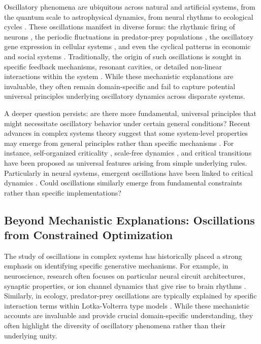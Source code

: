 \documentclass[11pt,a4paper]{article}
\begin{document}
Oscillatory phenomena are ubiquitous across natural and artificial systems, from the quantum scale to astrophysical dynamics, from neural rhythms to ecological cycles \cite{Strogatz2015,Pikovsky2003,Buzsaki2006}. These oscillations manifest in diverse forms: the rhythmic firing of neurons \cite{Buzsaki2006}, the periodic fluctuations in predator-prey populations \cite{Winfree2001}, the oscillatory gene expression in cellular systems \cite{Kauffman1993}, and even the cyclical patterns in economic and social systems \cite{Haken2006}. Traditionally, the origin of such oscillations is sought in specific feedback mechanisms, resonant cavities, or detailed non-linear interactions within the system \cite{Winfree2001}. While these mechanistic explanations are invaluable, they often remain domain-specific and fail to capture potential universal principles underlying oscillatory dynamics across disparate systems.

A deeper question persists: are there more fundamental, universal principles that might necessitate oscillatory behavior under certain general conditions? Recent advances in complex systems theory suggest that some system-level properties may emerge from general principles rather than specific mechanisms \cite{Bak1987,Jensen1998,Kello2010,Thurner2018,Morowitz2002}. For instance, self-organized criticality \cite{Bak1987,Hesse2014}, scale-free dynamics \cite{Kello2010,Cavagna2010,Bialek2012}, and critical transitions \cite{Scheffer2009,Scheffer2012} have been proposed as universal features arising from simple underlying rules. Particularly in neural systems, emergent oscillations have been linked to critical dynamics \cite{Beggs2003,Shew2013,Cocchi2017,Chialvo2010}. Could oscillations similarly emerge from fundamental constraints rather than specific implementations?

\subsection*{Beyond Mechanistic Explanations: Oscillations from Constrained Optimization}

The study of oscillations in complex systems has historically placed a strong emphasis on identifying specific generative mechanisms. For example, in neuroscience, research often focuses on particular neural circuit architectures, synaptic properties, or ion channel dynamics that give rise to brain rhythms \cite{Buzsaki2006,Wang2010}. Similarly, in ecology, predator-prey oscillations are typically explained by specific interaction terms within Lotka-Volterra type models \cite{Winfree2001}. While these mechanistic accounts are invaluable and provide crucial domain-specific understanding, they often highlight the diversity of oscillatory phenomena rather than their underlying unity.
\end{document}
